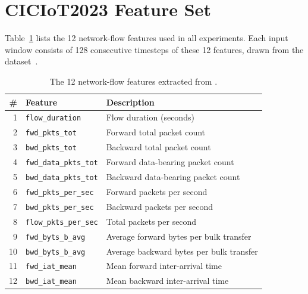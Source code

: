 \appendix

\section{CICIoT2023 Feature Set}
\label{app:features}

Table~\ref{tab:features} lists the 12 network-flow features used in all
experiments.  Each input window consists of 128 consecutive timesteps of
these 12 features, drawn from the \dataset{}
dataset~\cite{neto2023ciciot}.

\begin{table}[h]
\centering
\caption{The 12 network-flow features extracted from \dataset{}.}
\label{tab:features}
\begin{tabular}{rll}
\toprule
\# & Feature & Description \\
\midrule
1  & \texttt{flow\_duration}      & Flow duration (seconds) \\
2  & \texttt{fwd\_pkts\_tot}      & Forward total packet count \\
3  & \texttt{bwd\_pkts\_tot}      & Backward total packet count \\
4  & \texttt{fwd\_data\_pkts\_tot}& Forward data-bearing packet count \\
5  & \texttt{bwd\_data\_pkts\_tot}& Backward data-bearing packet count \\
6  & \texttt{fwd\_pkts\_per\_sec} & Forward packets per second \\
7  & \texttt{bwd\_pkts\_per\_sec} & Backward packets per second \\
8  & \texttt{flow\_pkts\_per\_sec}& Total packets per second \\
9  & \texttt{fwd\_byts\_b\_avg}   & Average forward bytes per bulk transfer \\
10 & \texttt{bwd\_byts\_b\_avg}   & Average backward bytes per bulk transfer \\
11 & \texttt{fwd\_iat\_mean}      & Mean forward inter-arrival time \\
12 & \texttt{bwd\_iat\_mean}      & Mean backward inter-arrival time \\
\bottomrule
\end{tabular}
\end{table}

